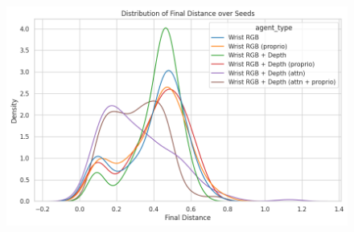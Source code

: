   \begin{figure}[htpb]
    \centering
    \includegraphics[scale=0.6]{assets/evaluation/proprio/proprio-final-dist.png}
    \caption{}\label{apx:Z-proprio-dist-wd}
  \end{figure}

